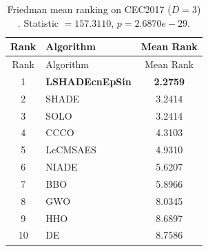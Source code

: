 \begin{center}
\small
\renewcommand{\arraystretch}{1.25}
\begin{longtable}{clc}
\caption{Friedman mean ranking on CEC2017 ($D=3$) . Statistic $=157.3110$, $p=2.6870e-29$.}
\label{tab:friedman_CEC2017_3} \\
\toprule
Rank & Algorithm & Mean Rank \\
\midrule
\endfirsthead
\toprule
Rank & Algorithm & Mean Rank \\
\midrule
\endhead
1 & \textbf{LSHADEcnEpSin} & \textbf{2.2759} \\
2 & SHADE & 3.2414 \\
3 & SOLO & 3.2414 \\
4 & CCCO & 4.3103 \\
5 & LcCMSAES & 4.9310 \\
6 & NIADE & 5.6207 \\
7 & BBO & 5.8966 \\
8 & GWO & 8.0345 \\
9 & HHO & 8.6897 \\
10 & DE & 8.7586 \\
\bottomrule
\end{longtable}
\end{center}